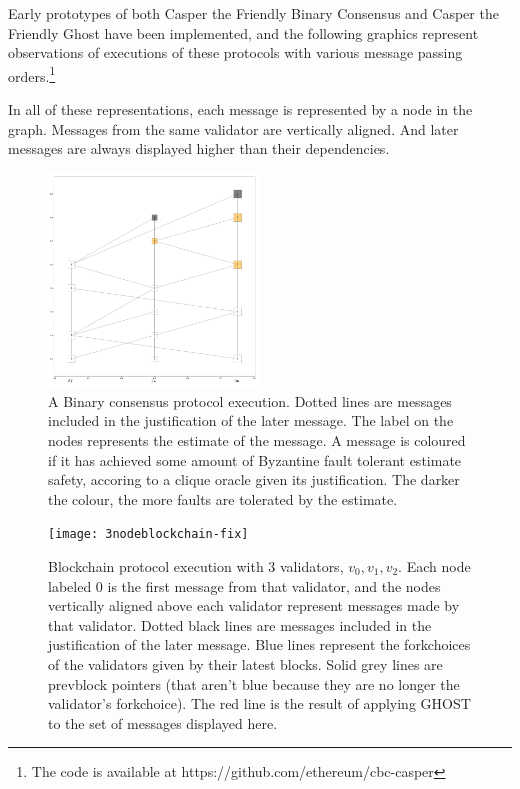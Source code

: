 \documentclass{article}
\theoremstyle{definition}
\begin{document}
Early prototypes of both Casper the Friendly Binary Consensus and Casper the Friendly Ghost have been implemented, and the following graphics represent observations of executions of these protocols with various message passing orders.\footnote{The code is available at https://github.com/ethereum/cbc-casper}

In all of these representations, each message is represented by a node in the graph. Messages from the same validator are vertically aligned. And later messages are always displayed higher than their dependencies.

\begin{figure}[h!]
\centering
\includegraphics[width=0.5\textwidth]{3binary}
\caption{A Binary consensus protocol execution. Dotted lines are messages included in the justification of the later message. The label on the nodes represents the estimate of the message. A message is coloured if it has achieved some amount of Byzantine fault tolerant estimate safety, accoring to a clique oracle given its justification. The darker the colour, the more faults are tolerated by the estimate.}
\end{figure}


\begin{figure}[h!]
\centering
\texttt{[image: 3nodeblockchain-fix]}
\caption{Blockchain protocol execution with 3 validators, $v_0, v_1, v_2$. Each node labeled $0$ is the first message from that validator, and the nodes vertically aligned above each validator represent messages made by that validator. Dotted black lines are messages included in the justification of the later message. Blue lines represent the forkchoices of the validators given by their latest blocks. Solid grey lines are prevblock pointers (that aren't blue because they are no longer the validator's forkchoice). The red line is the result of applying GHOST to the set of messages displayed here.}
\end{figure}
\end{document}

